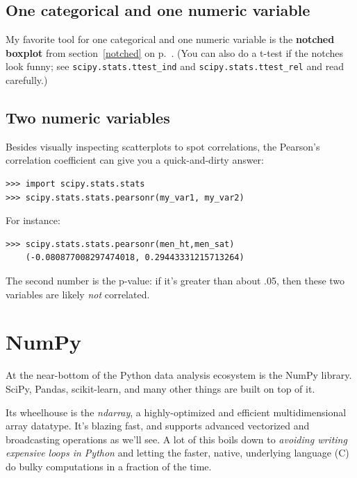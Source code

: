 \subsection{One categorical and one numeric variable}

My favorite tool for one categorical and one numeric variable is the
\textbf{notched boxplot} from section~\ref{notched} on p.~\pageref{notched}.
(You can also do a t-test if the notches look funny; see
\texttt{scipy.stats.ttest\_ind} and \texttt{scipy.stats.ttest\_rel} and read
carefully.)


\subsection{Two numeric variables}

Besides visually inspecting scatterplots to spot correlations, the Pearson's
correlation coefficient can give you a quick-and-dirty answer:
\label{pearsonsR}

\begin{Verbatim}[fontsize=\small,samepage=true,frame=single]
>>> import scipy.stats.stats
>>> scipy.stats.stats.pearsonr(my_var1, my_var2)
\end{Verbatim}

For instance:

\begin{Verbatim}[fontsize=\small,samepage=true,frame=single]
>>> scipy.stats.stats.pearsonr(men_ht,men_sat)
    (-0.080877008297474018, 0.29443331215713264)
\end{Verbatim}

The second number is the p-value: if it's greater than about .05, then these
two variables are likely \textit{not} correlated.


\section{NumPy}
\label{NumPy}

At the near-bottom of the Python data analysis ecosystem is the NumPy
library. SciPy, Pandas, scikit-learn, and many other things are built on top
of it.

Its wheelhouse is the \textit{ndarray}, a highly-optimized and efficient
multidimensional array datatype. It's blazing fast, and supports advanced
vectorized and broadcasting operations as we'll see. A lot of this boils down
to \textit{avoiding writing expensive loops in Python} and letting the faster,
native, underlying language (C) do bulky computations in a fraction of the
time.

